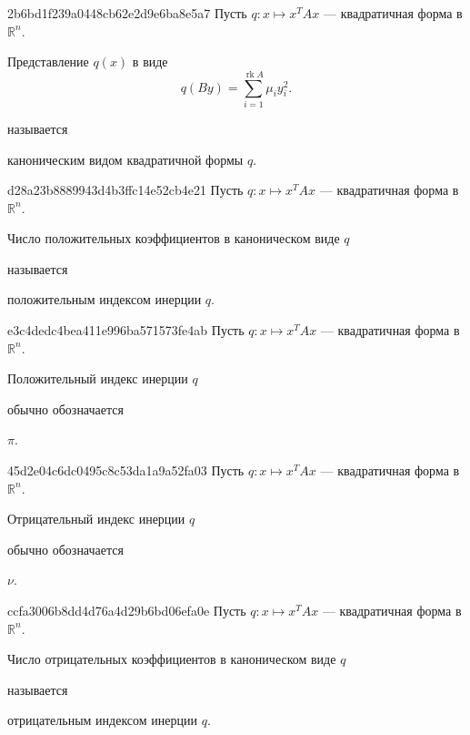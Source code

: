 \begin{note}{2b6bd1f239a0448cb62e2d9e6ba8e5a7}
    Пусть \({ q : x \mapsto x^{T}Ax }\) --- квадратичная форма в \({ \mathbb R^{n} }\).
    \begin{icloze}{1}
        Представление \({ q(x) }\) в виде
        \[
            q(By) = \sum_{i=1}^{\operatorname{rk} A} \mu_i y_i^2.
        \]
    \end{icloze}
    называется \begin{icloze}{2}каноническим видом квадратичной формы \({ q }\).\end{icloze}
\end{note}

\begin{note}{d28a23b8889943d4b3ffc14e52cb4e21}
    Пусть \({ q : x \mapsto x^{T}Ax }\) --- квадратичная форма в \({ \mathbb R^{n} }\).
    \begin{icloze}{1}Число положительных коэффициентов в каноническом виде \({ q }\)\end{icloze} называется \begin{icloze}{2}положительным индексом инерции \({ q }\).\end{icloze}
\end{note}

\begin{note}{e3c4dedc4bea411e996ba571573fe4ab}
    Пусть \({ q : x \mapsto x^{T}Ax }\) --- квадратичная форма в \({ \mathbb R^{n} }\).
    \begin{icloze}{2}Положительный индекс инерции \({ q }\)\end{icloze} обычно обозначается \begin{icloze}{1}\({ \pi }\).\end{icloze}
\end{note}

\begin{note}{45d2e04c6dc0495c8c53da1a9a52fa03}
    Пусть \({ q : x \mapsto x^{T}Ax }\) --- квадратичная форма в \({ \mathbb R^{n} }\).
    \begin{icloze}{2}Отрицательный индекс инерции \({ q }\)\end{icloze} обычно обозначается \begin{icloze}{1}\({ \nu }\).\end{icloze}
\end{note}

\begin{note}{ccfa3006b8dd4d76a4d29b6bd06efa0e}
    Пусть \({ q : x \mapsto x^{T}Ax }\) --- квадратичная форма в \({ \mathbb R^{n} }\).
    \begin{icloze}{1}Число отрицательных коэффициентов в каноническом виде \({ q }\)\end{icloze} называется \begin{icloze}{2}отрицательным индексом инерции \({ q }\).\end{icloze}
\end{note}

